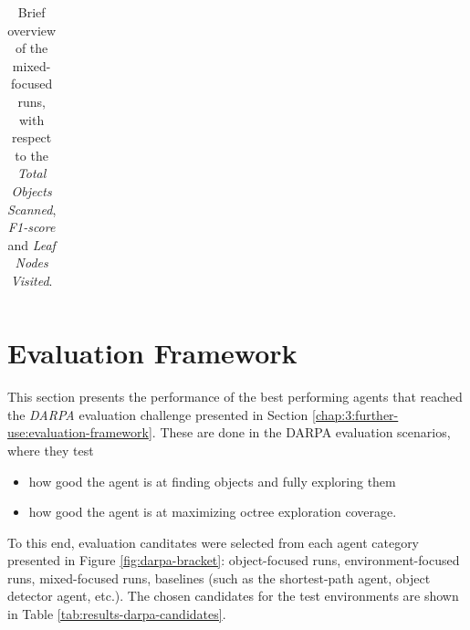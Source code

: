 \begin{longtable}{|l|c|c|c|c|}
    \caption{Brief overview of the mixed-focused runs, with respect to the \textit{Total Objects Scanned}, \textit{F1-score} and \textit{Leaf Nodes Visited}.}
    \label{tab:results-mixed-agents}
\end{longtable}




\section{Evaluation Framework}
This section presents the performance of the best performing agents that reached the \textit{DARPA} evaluation challenge presented in Section \ref{chap:3:further-use:evaluation-framework}. 
These are done in the DARPA evaluation scenarios, where they test
\begin{itemize}
    \item how good the agent is at finding objects and fully exploring them
    \item how good the agent is at maximizing octree exploration coverage. 
\end{itemize}

% 
To this end, evaluation canditates were selected from each agent category presented in Figure \ref{fig:darpa-bracket}: object-focused runs, environment-focused runs, mixed-focused runs, baselines (such as the shortest-path agent, object detector agent, etc.). The chosen candidates for the test environments are shown in Table \ref{tab:results-darpa-candidates}. 



